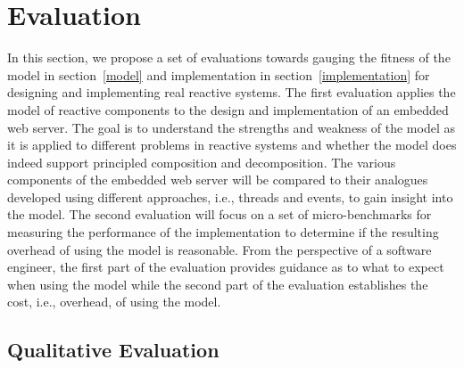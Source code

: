 \section{Evaluation \label{evaluation}}

In this section, we propose a set of evaluations towards gauging the fitness of the model in section~\ref{model} and implementation in section~\ref{implementation} for designing and implementing real reactive systems.
The first evaluation applies the model of reactive components to the design and implementation of an embedded web server.
The goal is to understand the strengths and weakness of the model as it is applied to different problems in reactive systems and whether the model does indeed support principled composition and decomposition.
The various components of the embedded web server will be compared to their analogues developed using different approaches, i.e., threads and events, to gain insight into the model.
The second evaluation will focus on a set of micro-benchmarks for measuring the performance of the implementation to determine if the resulting overhead of using the model is reasonable.
From the perspective of a software engineer, the first part of the evaluation provides guidance as to what to expect when using the model while the second part of the evaluation establishes the cost, i.e., overhead, of using the model.

\subsection{Qualitative Evaluation}

